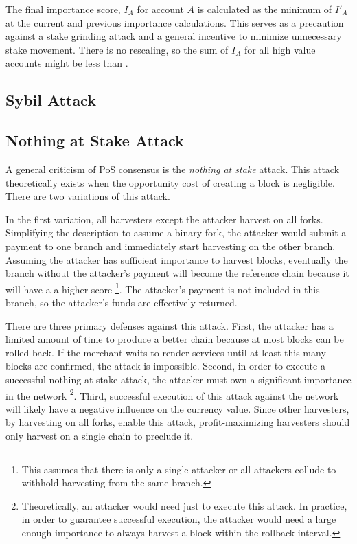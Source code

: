 The final importance score, $I_A$ for account $A$ is calculated as the minimum of $I'_A$ at the current and previous importance calculations.
This serves as a precaution against a stake grinding attack and a general incentive to minimize unnecessary stake movement.
There is no rescaling, so the sum of $I_A$ for all high value accounts might be less than .

\subsection{Sybil Attack}

\subsection{Nothing at Stake Attack}

A general criticism of PoS consensus is the \emph{nothing at stake} attack.
This attack theoretically exists when the opportunity cost of creating a block is negligible.
There are two variations of this attack.

In the first variation, all harvesters except the attacker harvest on all forks.
Simplifying the description to assume a binary fork, the attacker would submit a payment to one branch and immediately start harvesting on the other branch.
Assuming the attacker has sufficient importance to harvest blocks, eventually the branch without the attacker's payment will become the reference chain because it will have a a higher score
\footnote{This assumes that there is only a single attacker or all attackers collude to withhold harvesting from the same branch.}.
The attacker's payment is not included in this branch, so the attacker's funds are effectively returned.

There are three primary defenses against this attack.
First, the attacker has a limited amount of time to produce a better chain because at most  blocks can be rolled back.
If the merchant waits to render services until at least this many blocks are confirmed, the attack is impossible.
Second, in order to execute a successful nothing at stake attack, the attacker must own a significant importance in the network
\footnote{
	Theoretically, an attacker would need just  to execute this attack.
	In practice, in order to guarantee successful execution, the attacker would need a large enough importance to always harvest a block within the rollback interval.
}.
Third, successful execution of this attack against the network will likely have a negative influence on the currency value.
Since other harvesters, by harvesting on all forks, enable this attack, profit-maximizing harvesters should only harvest on a single chain to preclude it.

